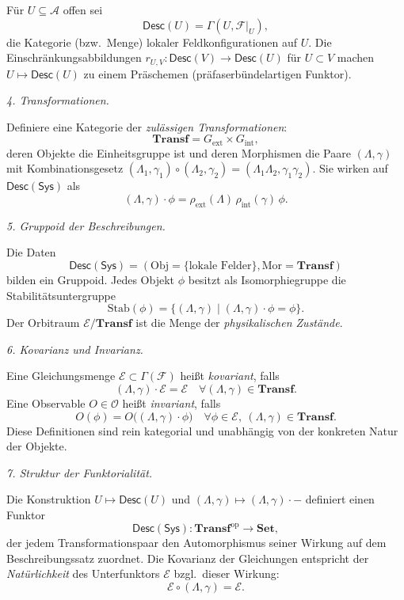\documentclass[10pt, letterpaper]{article}
\begin{document}
Für $U\subseteq\mathcal{A}$ offen sei
\[
\mathsf{Desc}(U) = \Gamma(U,\mathcal{F}|_U),
\]
die Kategorie (bzw.\ Menge) lokaler Feldkonfigurationen auf $U$.  
Die Einschränkungsabbildungen $r_{U,V}: \mathsf{Desc}(V)\to \mathsf{Desc}(U)$
für $U\subset V$ machen $U\mapsto\mathsf{Desc}(U)$ zu einem Präschemen (präfaserbündelartigen Funktor).

\bigskip
\emph{4. Transformationen.}

Definiere eine Kategorie der \emph{zulässigen Transformationen}:
\[
\mathbf{Transf} = G_{\mathrm{ext}}\times G_{\mathrm{int}},
\]
deren Objekte die Einheitsgruppe ist und deren Morphismen die Paare $(\Lambda,\gamma)$ mit
Kombinationsgesetz $(\Lambda_1,\gamma_1)\circ(\Lambda_2,\gamma_2)=(\Lambda_1\Lambda_2,\gamma_1\gamma_2)$.
Sie wirken auf $\mathsf{Desc}(\mathsf{Sys})$ als
\[
(\Lambda,\gamma)\cdot \phi
= \rho_{\mathrm{ext}}(\Lambda)\,\rho_{\mathrm{int}}(\gamma)\,\phi.
\]

\bigskip
\emph{5. Gruppoid der Beschreibungen.}

Die Daten
\[
\mathsf{Desc}(\mathsf{Sys})
=(\mathrm{Obj}=\{\text{lokale Felder}\},
 \mathrm{Mor}=\mathbf{Transf})
\]
bilden ein Gruppoid.  
Jedes Objekt $\phi$ besitzt als Isomorphiegruppe die Stabilitätsuntergruppe
\[
\mathrm{Stab}(\phi)
=\{(\Lambda,\gamma)\mid (\Lambda,\gamma)\cdot\phi=\phi\}.
\]
Der Orbitraum $\mathcal{E}/\mathbf{Transf}$ ist die Menge der \emph{physikalischen Zustände}.

\bigskip
\emph{6. Kovarianz und Invarianz.}

Eine Gleichungsmenge $\mathcal{E}\subset \Gamma(\mathcal{F})$ heißt
\emph{kovariant}, falls
\[
(\Lambda,\gamma)\cdot \mathcal{E} = \mathcal{E}
\quad\forall (\Lambda,\gamma)\in\mathbf{Transf}.
\]
Eine Observable $O\in\mathcal{O}$ heißt \emph{invariant}, falls
\[
O(\phi)=O\!\big((\Lambda,\gamma)\cdot\phi\big)
\quad\forall \phi\in\mathcal{E},\ (\Lambda,\gamma)\in\mathbf{Transf}.
\]
Diese Definitionen sind rein kategorial und unabhängig von der
konkreten Natur der Objekte.

\bigskip
\emph{7. Struktur der Funktorialität.}

Die Konstruktion $U\mapsto\mathsf{Desc}(U)$ und $(\Lambda,\gamma)\mapsto(\Lambda,\gamma)\cdot-$
definiert einen Funktor
\[
\mathsf{Desc}(\mathsf{Sys}): \mathbf{Transf}^{\mathrm{op}} \longrightarrow \mathbf{Set},
\]
der jedem Transformationspaar den Automorphismus seiner Wirkung auf dem
Beschreibungssatz zuordnet.  Die Kovarianz der Gleichungen entspricht der
\emph{Natürlichkeit} des Unterfunktors $\mathcal{E}$ bzgl.\ dieser Wirkung:
\[
\mathcal{E}\circ(\Lambda,\gamma)
= \mathcal{E}.
\]
\end{document}
